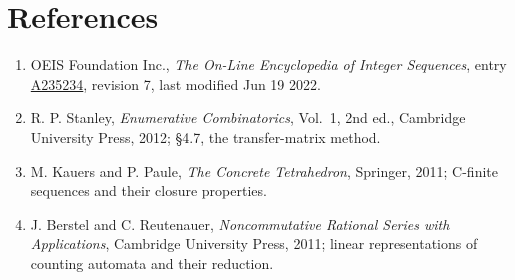 \documentclass[11pt]{article}
\theoremstyle{definition}
\begin{document}
\section{References}

\begin{enumerate}

\item OEIS Foundation Inc., \emph{The On-Line Encyclopedia of Integer Sequences}, entry \href{https://oeis.org/A235234}{A235234}, revision 7, last modified Jun 19 2022.

\item R. P. Stanley, \emph{Enumerative Combinatorics}, Vol.~1, 2nd ed., Cambridge University Press, 2012; \S4.7, the transfer-matrix method.

\item M. Kauers and P. Paule, \emph{The Concrete Tetrahedron}, Springer, 2011; C-finite sequences and their closure properties.

\item J. Berstel and C. Reutenauer, \emph{Noncommutative Rational Series with Applications}, Cambridge University Press, 2011; linear representations of counting automata and their reduction.

\end{enumerate}
\end{document}
